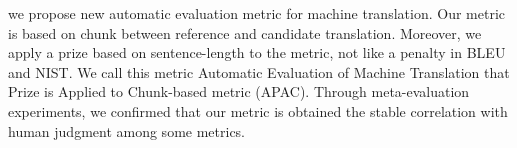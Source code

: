 we propose new automatic evaluation metric for machine translation. Our metric is based on chunk between reference and candidate translation. Moreover, we apply a prize based on sentence-length to the metric, not like a penalty in BLEU and NIST. We call this metric Automatic Evaluation of Machine Translation that Prize is Applied to Chunk-based metric (APAC). Through meta-evaluation experiments, we confirmed that our metric is obtained the stable correlation with human judgment among some metrics.
